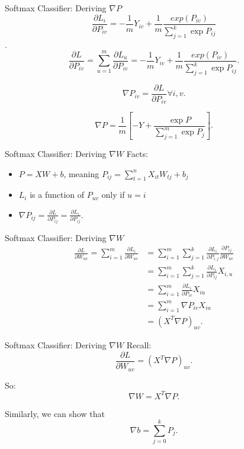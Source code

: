 \documentclass{beamer}
\begin{document}
  \begin{frame}{Softmax Classifier: Deriving $\nabla P$}
    $$ \frac{\partial L_i}{\partial P_{iv}} = -\frac{1}{m} Y_{iv}
        + \frac{1}{m} \frac{exp(P_{iv})}{\sum_{j=1}^k \exp P_{ij}}$$.
    $$ \frac{\partial L}{\partial P_{iv}} =
       \sum_{u=1}^m \frac{\partial L_u}{\partial P_{iv}} =
       -\frac{1}{m} Y_{iv} + \frac{1}{m} \frac{exp(P_{iv})}{\sum_{j=1}^k
       \exp P_{ij}}. $$

    $$ \nabla P_{iv} = \frac{\partial L}{\partial P_{iv}} \forall i, v.$$

    $$ \nabla P = \frac{1}{m} \left[ -Y + \frac{\exp P}{\sum_{j=1}^m \exp P_j}
       \right]. $$
  \end{frame}

  \begin{frame}{Softmax Classifier: Deriving $\nabla W$}
    Facts:
    \begin{itemize}
      \item $P = XW + b$, meaning $P_{ij} = \sum_{t=1}^n X_{it}W_{tj} + b_j $
      \item $L_i$ is a function of $P_{uv}$ only if $u = i$
      \item $\nabla P_{ij} = \frac{\partial L}{\partial P_{ij}} 
            = \frac{\partial L_i}{\partial P_{ij}}$.
    \end{itemize}
  \end{frame}

  \begin{frame}{Softmax Classifier: Deriving $\nabla W$}
    \begin{align*} 
         \frac{\partial L}{\partial W_{uv}} = 
         \sum_{i=1}^m \frac{\partial L_i}{\partial W_{uv}} &= 
         \sum_{i=1}^m \sum_{j=1}^k \frac{\partial L_i}{\partial P_{i, j}}
           \frac{\partial P_{ij}}{\partial W_{uv}}\\
         &= \sum_{i=1}^m \sum_{j=1}^k
             \frac{\partial L_i}{\partial P_{ij}} X_{i, u}\\
         &= \sum_{i=1}^m \frac{\partial L_i}{\partial P_{iv}} X_{iu}\\ %
         &= \sum_{i=1}^m \nabla P_{iv} X_{iu}\\
         &= \left( X^T \nabla P \right)_{uv}.
    \end{align*}

  \end{frame}

  \begin{frame}{Softmax Classifier: Deriving $\nabla W$}
    Recall: $$\frac{\partial L}{\partial W_{uv}} =  \left( X^T \nabla P
    \right)_{uv}.$$

    So:
    $$ \nabla W = X^T \nabla P. $$

    Similarly, we can show that
    $$ \nabla b = \sum_{j=0}^k P_j. $$
  \end{frame}
\end{document}

